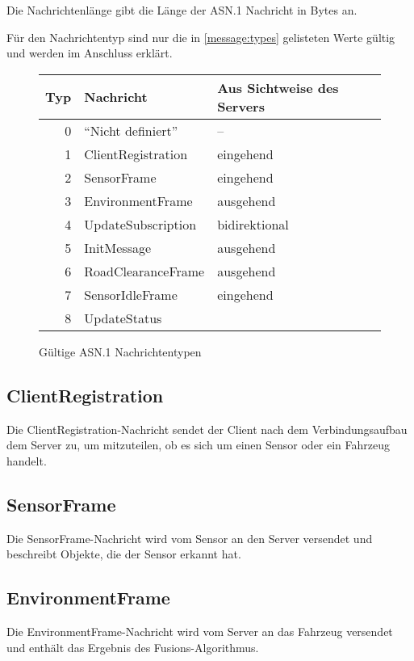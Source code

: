 Die Nachrichtenlänge gibt die Länge der ASN.1 Nachricht in Bytes an.

Für den Nachrichtentyp sind nur die in \autoref{message:types} gelisteten Werte gültig und werden im Anschluss erklärt.

\begin{figure}[H]
	\centering
	\begin{tabular}{r|l|l}
		Typ & Nachricht & Aus Sichtweise des Servers \\
		\hline
		0 & \enquote{Nicht definiert} & -- \\
		1 & ClientRegistration & eingehend \\
		2 & SensorFrame & eingehend \\
		3 & EnvironmentFrame & ausgehend \\
		4 & UpdateSubscription & bidirektional \\
		5 & InitMessage & ausgehend \\
		6 & RoadClearanceFrame & ausgehend \\
		7 & SensorIdleFrame & eingehend \\
		8 & UpdateStatus & \todo{eingehend} \\
	\end{tabular}
	\caption{Gültige ASN.1 Nachrichtentypen}
	\label{message:types}
\end{figure}

\subsection{ClientRegistration}
\label{msg:client_registration}

Die ClientRegistration-Nachricht sendet der Client nach dem Verbindungsaufbau dem Server zu, um mitzuteilen, ob es sich um einen Sensor oder ein Fahrzeug handelt.

\subsection{SensorFrame}
\label{msg:sensor_frame}

Die SensorFrame-Nachricht wird vom Sensor an den Server versendet und beschreibt Objekte, die der Sensor erkannt hat.

\subsection{EnvironmentFrame}
\label{msg:environment_frame}

Die EnvironmentFrame-Nachricht wird vom Server an das Fahrzeug versendet und enthält das Ergebnis des Fusions-Algorithmus.

